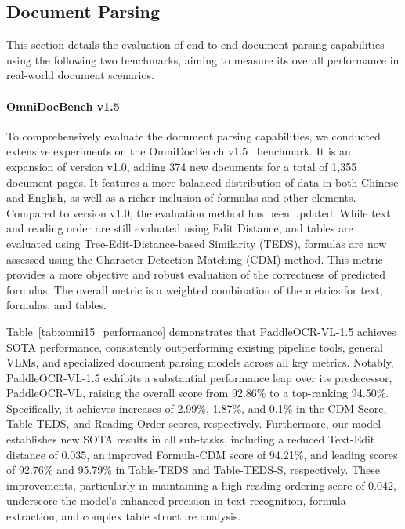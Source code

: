 \documentclass[11pt, a4paper,logo,  copyright, nonumbering]{paddleocr}
\begin{document}
\subsection{Document Parsing}
\label{Document Parsing}

This section details the evaluation of end-to-end document parsing capabilities using the following two benchmarks, aiming to measure its overall performance in real-world document scenarios. 

\paragraph{OmniDocBench v1.5} To comprehensively evaluate the document parsing capabilities, we conducted extensive experiments on the OmniDocBench v1.5~\cite{niu2025mineru2} benchmark. It is an expansion of version v1.0, adding 374 new documents for a total of 1,355 document pages. It features a more balanced distribution of data in both Chinese and English, as well as a richer inclusion of formulas and other elements. Compared to version v1.0, the evaluation method has been updated. While text and reading order are still evaluated using Edit Distance, and tables are evaluated using Tree-Edit-Distance-based Similarity (TEDS), formulas are now assessed using the Character Detection Matching (CDM) \cite{Wang_cdm_2025_CVPR} method. This metric provides a more objective and robust evaluation of the correctness of predicted formulas. The overall metric is a weighted combination of the metrics for text, formulas, and tables. 

Table~\ref{tab:omni15_performance} demonstrates that PaddleOCR-VL-1.5 achieves SOTA performance, consistently outperforming existing pipeline tools, general VLMs, and specialized document parsing models across all key metrics. Notably, PaddleOCR-VL-1.5 exhibits a substantial performance leap over its predecessor, PaddleOCR-VL, raising the overall score from 92.86\% to a top-ranking 94.50\%. Specifically, it achieves increases of 2.99\%, 1.87\%, and 0.1\% in the CDM Score, Table-TEDS, and Reading Order scores, respectively. Furthermore, our model establishes new SOTA results in all sub-tasks, including a reduced Text-Edit distance of 0.035, an improved Formula-CDM score of 94.21\%, and leading scores of 92.76\% and 95.79\% in Table-TEDS and Table-TEDS-S, respectively. These improvements, particularly in maintaining a high reading ordering score of 0.042, underscore the model's enhanced precision in text recognition, formula extraction, and complex table structure analysis.
\end{document}
